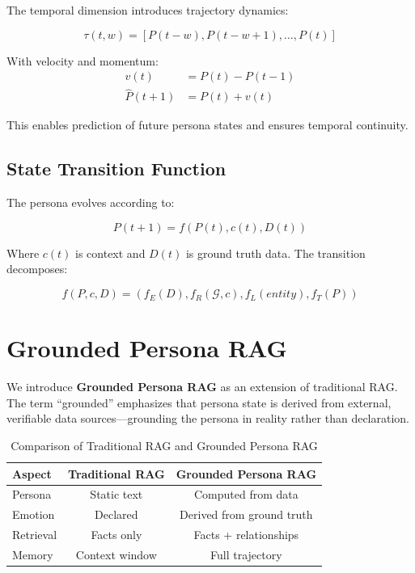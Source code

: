 \documentclass[11pt]{article}
\begin{document}
The temporal dimension introduces trajectory dynamics:

\begin{equation}
\tau(t, w) = [P(t-w), P(t-w+1), \ldots, P(t)]
\end{equation}

With velocity and momentum:
\begin{align}
v(t) &= P(t) - P(t-1) \\
\hat{P}(t+1) &= P(t) + v(t)
\end{align}

This enables prediction of future persona states and ensures temporal continuity.

\subsection{State Transition Function}

The persona evolves according to:

\begin{equation}
P(t+1) = f(P(t), c(t), D(t))
\end{equation}

Where $c(t)$ is context and $D(t)$ is ground truth data. The transition decomposes:

\begin{equation}
f(P, c, D) = (f_E(D), f_R(\mathcal{G}, c), f_L(entity), f_T(P))
\end{equation}

\section{Grounded Persona RAG}

We introduce \textbf{Grounded Persona RAG} as an extension of traditional RAG. The term ``grounded'' emphasizes that persona state is derived from external, verifiable data sources---grounding the persona in reality rather than declaration.

\begin{table}[h]
\centering
\begin{tabular}{lcc}
\toprule
\textbf{Aspect} & \textbf{Traditional RAG} & \textbf{Grounded Persona RAG} \\
\midrule
Persona & Static text & Computed from data \\
Emotion & Declared & Derived from ground truth \\
Retrieval & Facts only & Facts + relationships \\
Memory & Context window & Full trajectory \\
\bottomrule
\end{tabular}
\caption{Comparison of Traditional RAG and Grounded Persona RAG}
\end{table}
\end{document}
